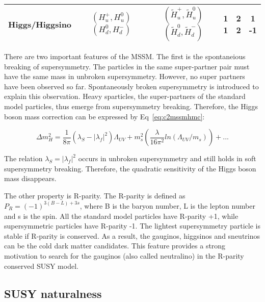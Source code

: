 \begin{table}[htbp]
\begin{centering}
\begin{tabular}{|c|c|c|c|c|c|}
\hline
Higgs/Higgsino   & \specialcell{$(H_{u}^{+},H_{u}^{0})$ \\ $(H_{d}^{0},H_{d}^{-})$} & \specialcell{$(\tilde{H}_{u}^{+},\tilde{H}_{u}^{0})$ \\ $(\tilde{H}_{d}^{0},\tilde{H}_{d}^{-})$} & \specialcell{1 \\ 1} & \specialcell{2 \\ 2} & \specialcell{1 \\ -1} \\
\hline
\end{tabular}
\par\end{centering}
\end{table}

There are two important features of the MSSM. The first is the spontaneious breaking of supersymmetry. The particles in the same super-partner pair must have the same mass in unbroken supersymmetry. However, no super partners have been observed so far. Spontaneously broken supersymmetry is introduced to explain this observation. Heavy sparticles, the super-partners of the standard model particles, thus emerge from supersymmetry breaking. Therefore, the Higgs boson mass correction can be expressed by Eq~\ref{eq:c2mssmhmc}:

\begin{equation}
 \Delta m_{H}^{2} = \frac{1}{8\pi}(\lambda_{S}-|\lambda_{f}|^{2})\Lambda_{UV}+m_{s}^{2}(\frac{\lambda}{16\pi^{2}}ln(\Lambda_{UV}/m_{s}))+...
 \label{eq:c2mssmhmc}
\end{equation}

The relation $\lambda_{S}=|\lambda_{f}|^{2}$ occurs in unbroken supersymmetry and still holds in soft supersymmetry breaking\cite{Martin:1997ns}. Therefore, the quadratic sensitivity of the Higgs boson mass disappears.

The other property is R-parity. The R-parity is defined as $P_{R}=(-1)^{3(B-L)+3s}$, where B is the baryon number, L is the lepton number and s is the spin. All the standard model particles have R-parity +1, while supersymmetric particles have R-parity -1. The lightest supersymmetry particle is stable if R-parity is conserved. As a result, the gauginos, higgsinos and sneutrinos can be the cold dark matter candidates. This feature provides a strong motivation to search for the gauginos (also called neutralino) in the R-parity conserved SUSY model. 

\clearpage
\subsection{SUSY naturalness}

